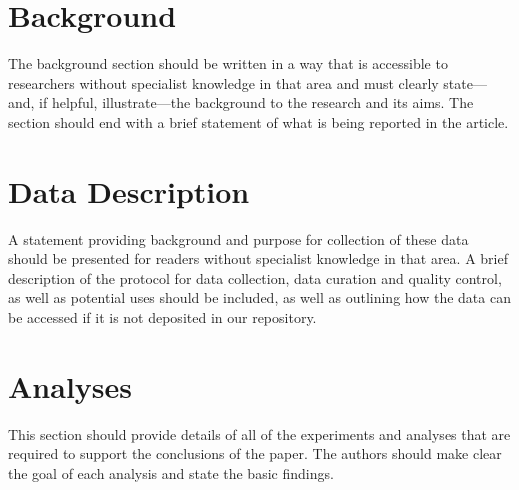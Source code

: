\documentclass[a4paper,num-refs]{oup-contemporary}
\begin{document}
\section{Background}
\label{sec:background}

The background section should be written in a way that is accessible to researchers without specialist knowledge in that area and must clearly state---and, if helpful, illustrate---the background to the research and its aims. The section should end with a brief statement of what is being reported in the article.


\section{Data Description}

A statement providing background and purpose for collection of these data should be presented for readers without specialist knowledge in that area. A brief description of the protocol for data collection, data curation and quality control, as well as potential uses should be included, as well as outlining how the data can be accessed if it is not deposited in our repository.



\section{Analyses}

This section should provide details of all of the experiments and analyses that are required to support the conclusions of the paper. The authors should make clear the goal of each analysis and state the basic findings.
\end{document}
